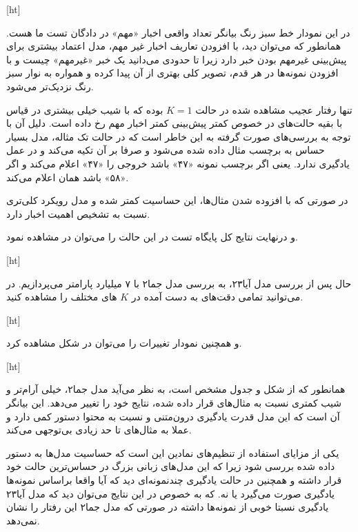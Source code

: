 [ht]

در این نمودار خط سبز رنگ بیانگر تعداد واقعی اخبار «مهم» در دادگان تست ما هست. همانطور که می‌توان دید، با افزودن تعاریف اخبار غیر مهم، مدل اعتماد بیشتری برای پیش‌بینی غیرمهم بودن خبر دارد زیرا تا حدودی می‌دانید یک خبر «غیرمهم» چیست و با افزودن نمونه‌ها در هر قدم، تصویر کلی بهتری از آن پیدا کرده و همواره به نوار سبز رنگ نزدیک‌تر می‌شود.

تنها رفتار عجیب مشاهده شده در حالت
$K = 1$
بوده که با شیب خیلی بیشتری در قیاس با بقیه حالت‌های در خصوص کمتر پیش‌بینی کمتر اخبار مهم رخ داده است. دلیل آن با توجه به بررسی‌های صورت گرفته به این خاطر است که در حالت تک مثاله، مدل بسیار حساس به برچسب مثال داده شده می‌شود و صرفا بر آن تکیه می‌کند و در عمل یادگیری ندارد. یعنی اگر برچسب نمونه «۴۷» باشد خروجی را «۴۷» اعلام می‌کند و اگر «۵۸» باشد همان اعلام می‌کند.

در صورتی که با افزوده شدن مثال‌ها، این حساسیت کمتر شده و مدل رویکرد کلی‌تری نسبت به تشخیص اهمیت اخبار دارد.

و درنهایت نتایج کل پایگاه تست در این حالت را می‌توان در  مشاهده نمود.


[ht]

حال پس از بررسی مدل آیا۲۳، به بررسی مدل جما۲ با ۷ میلیارد پارامتر می‌پردازیم. در  می‌توانید تمامی دقت‌های به دست آمده در
$K$
های مختلف را مشاهده کنید.

[ht]

و همچنین نمودار تغییرات را می‌توان در شکل  مشاهده کرد.


[ht]

همانطور که از شکل‌ و جدول مشخص است، به نظر می‌آید مدل جما۲، خیلی آرام‌تر و شیب‌ کمتری نسبت به مثال‌های قرار داده شده، نتایج خود را تغییر می‌دهد. این بیانگر آن است که این مدل قدرت یادگیری درون‌متنی و نسبت به محتوا دستور کمی دارد و عملا به مثال‌های تا حد زیادی بی‌توجهی می‌کند.

یکی از مزایای استفاده‌ از تنظیم‌های نمادین این است که حساسیت مدل‌ها به دستور داده شده بررسی شود زیرا که این مدل‌های زبانی بزرگ در حساس‌ترین حالت خود قرار داشته و همچنین در حالت یادگیری چندنمونه‌ای دید که آیا واقعا براساس نمونه‌ها یادگیری صورت می‌گیرد یا نه. که به خصوص در این نتایج می‌توان دید که مدل آیا۲۳ یادگیری نسبتا خوبی از نمونه‌ها داشته در صورتی که مدل جما۲ این رفتار را نشان نمی‌دهد.

